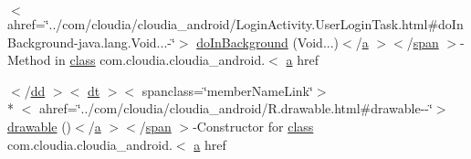 \begin{DoxyCompactItemize}
$<$ ahref=\char`\"{}../com/cloudia/cloudia\-\_\-android/Login\-Activity.\-User\-Login\-Task.\-html\#do\-In\-Background-\/java.\-lang.\-Void...-\/\char`\"{}$>$ \hyperlink{index-4_8html_aeec693d67163a0ff9da321f38fc5d303}{do\-In\-Background} (Void...)$<$/\hyperlink{style_8css_a5e8981582017bb8b84c21f148345d1f7}{a} $>$$<$/\hyperlink{stylesheet_8css_a8343996ebcf16220b04e54659aac31cc}{span} $>$-\/Method in \hyperlink{_tools_8html_acf06f836132665ba8114f5a414c2403f}{class} com.\-cloudia.\-cloudia\-\_\-android.$<$ \hyperlink{style_8css_a5e8981582017bb8b84c21f148345d1f7}{a} href
\item 
$<$/\hyperlink{stylesheet_8css_a47f4718a86835a7771ec592ece845221}{dd} $>$$<$ \hyperlink{stylesheet_8css_a107565fb4039d33b041380d6e0ea1d80}{dt} $>$$<$ spanclass=\char`\"{}member\-Name\-Link\char`\"{}$>$\\*
$<$ ahref=\char`\"{}../com/cloudia/cloudia\-\_\-android/R.\-drawable.\-html\#drawable-\/-\/\char`\"{}$>$ \hyperlink{index-4_8html_a40e02c3421241c19dbbb6a7cfcb2fd16}{drawable} ()$<$/\hyperlink{style_8css_a5e8981582017bb8b84c21f148345d1f7}{a} $>$$<$/\hyperlink{stylesheet_8css_a8343996ebcf16220b04e54659aac31cc}{span} $>$-\/Constructor for \hyperlink{_tools_8html_acf06f836132665ba8114f5a414c2403f}{class} com.\-cloudia.\-cloudia\-\_\-android.$<$ \hyperlink{style_8css_a5e8981582017bb8b84c21f148345d1f7}{a} href
\end{DoxyCompactItemize}
